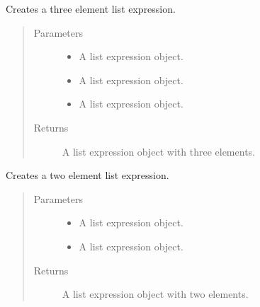 \documentclass[letterpaper,10pt,english]{sphinxmanual}
\begin{document}
\begin{fulllineitems}
\label{\detokenize{index:secondodb.api.support.secondolistexpr.three_element_list}}
Creates a three element list expression.
\begin{quote}\begin{description}
\item[{Parameters}] \leavevmode\begin{itemize}
\item {} 
 \textendash{} A list expression object.

\item {} 
 \textendash{} A list expression object.

\item {} 
 \textendash{} A list expression object.

\end{itemize}

\item[{Returns}] \leavevmode
A list expression object with three elements.

\end{description}\end{quote}

\end{fulllineitems}


\begin{fulllineitems}
\label{\detokenize{index:secondodb.api.support.secondolistexpr.two_element_list}}
Creates a two element list expression.
\begin{quote}\begin{description}
\item[{Parameters}] \leavevmode\begin{itemize}
\item {} 
 \textendash{} A list expression object.

\item {} 
 \textendash{} A list expression object.

\end{itemize}

\item[{Returns}] \leavevmode
A list expression object with two elements.

\end{description}\end{quote}

\end{fulllineitems}
\end{document}
